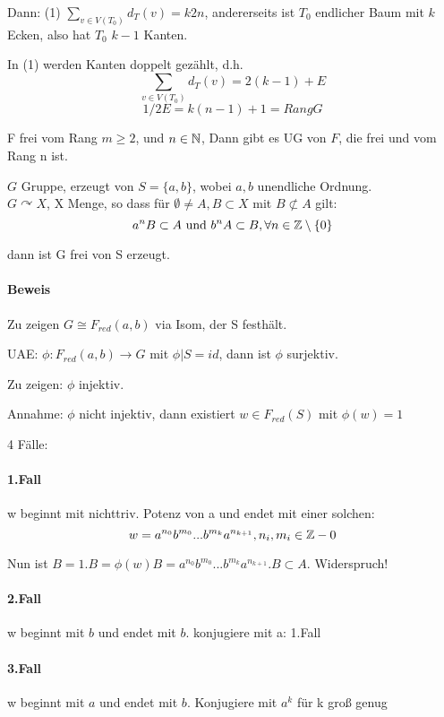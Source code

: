 \documentclass{article}
\begin{document}
Dann: (1) $\sum_{v\in V(T_0)} d_T(v) = k 2n$, andererseits ist $T_0$ endlicher Baum mit $k$ Ecken, also hat $T_0$ $k-1$ Kanten.

In (1) werden Kanten doppelt gezählt, d.h.
\[\sum_{v\in V(T_0)}d_T(v) = 2(k-1) + E\]
\[1/2 E = k(n-1) + 1 = Rang G\]

\Kor{}
F frei vom Rang $m \geq 2$, und $n\in \mathbb{N}$, Dann gibt es UG von $F$, die frei und vom Rang n ist.

$G$ Gruppe, erzeugt von $S = \{a,b\}$, wobei $a,b$ unendliche Ordnung.\\
$G \curvearrowright X$, X Menge, so dass für $\emptyset \neq A, B \subset X$
mit $B \not \subset A$ gilt:
\[a^nB \subset A \text{ und } b^nA \subset B, \forall n \in \mathbb{Z}\setminus\{0\} \]

dann ist G frei von S erzeugt.

\paragraph{Beweis}
Zu zeigen $G \cong F_{red}(a,b)$ via Isom, der S festhält.

UAE:
$\phi : F_{red}(a,b) \longrightarrow G$ mit $\phi|S = id$, dann ist $\phi$ surjektiv.

Zu zeigen: $\phi$ injektiv.

Annahme: $\phi$ nicht injektiv, dann existiert $w\in F_{red}(S)$ mit $\phi(w) = 1$

4 Fälle: 

\paragraph{1.Fall}
w beginnt mit nichttriv. Potenz von a und endet mit einer solchen:
\[w = a^{n_0}b^{m_0}...b^{m_k}a^{n_{k+1}}, n_i, m_i \in \mathbb{Z}- 0 \]

Nun ist $B = 1.B = \phi(w)B = a^{n_0}b^{m_0}...b^{m_k}a^{n_{k+1}}.B \subset A$. Widerspruch!

\paragraph{2.Fall}
w beginnt mit $b$ und endet mit $b$. konjugiere mit a: 1.Fall

\paragraph{3.Fall}
w beginnt mit $a$ und endet mit $b$. Konjugiere mit $a^k$ für k groß genug
\end{document}
